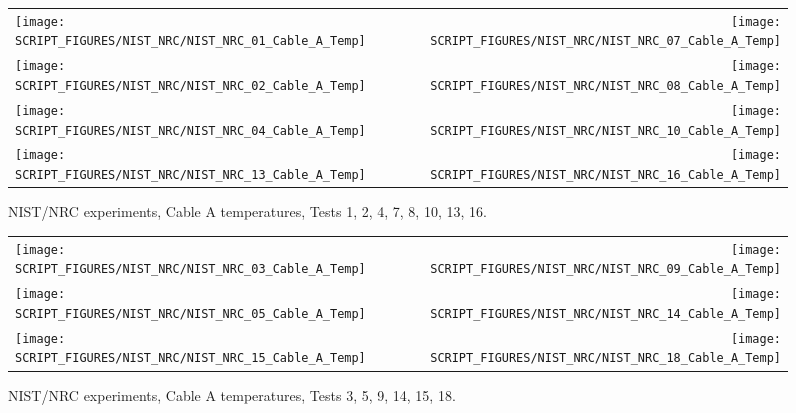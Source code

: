 \newpage

\begin{figure}[p]
\begin{tabular*}{\textwidth}{l@{\extracolsep{\fill}}r}
\texttt{[image: SCRIPT\_FIGURES/NIST\_NRC/NIST\_NRC\_01\_Cable\_A\_Temp]} &
\texttt{[image: SCRIPT\_FIGURES/NIST\_NRC/NIST\_NRC\_07\_Cable\_A\_Temp]} \\
\texttt{[image: SCRIPT\_FIGURES/NIST\_NRC/NIST\_NRC\_02\_Cable\_A\_Temp]} &
\texttt{[image: SCRIPT\_FIGURES/NIST\_NRC/NIST\_NRC\_08\_Cable\_A\_Temp]} \\
\texttt{[image: SCRIPT\_FIGURES/NIST\_NRC/NIST\_NRC\_04\_Cable\_A\_Temp]} &
\texttt{[image: SCRIPT\_FIGURES/NIST\_NRC/NIST\_NRC\_10\_Cable\_A\_Temp]} \\
\texttt{[image: SCRIPT\_FIGURES/NIST\_NRC/NIST\_NRC\_13\_Cable\_A\_Temp]} &
\texttt{[image: SCRIPT\_FIGURES/NIST\_NRC/NIST\_NRC\_16\_Cable\_A\_Temp]}
\end{tabular*}
\caption[NIST/NRC experiments, Cable A temperatures, Tests 1, 2, 4, 7, 8, 10, 13, 16]{NIST/NRC experiments, Cable A temperatures, Tests 1, 2, 4, 7, 8, 10, 13, 16.}
\label{NIST_NRC_Cable_A_Closed}
\end{figure}

\begin{figure}[p]
\begin{tabular*}{\textwidth}{l@{\extracolsep{\fill}}r}
\texttt{[image: SCRIPT\_FIGURES/NIST\_NRC/NIST\_NRC\_03\_Cable\_A\_Temp]} &
\texttt{[image: SCRIPT\_FIGURES/NIST\_NRC/NIST\_NRC\_09\_Cable\_A\_Temp]} \\
\texttt{[image: SCRIPT\_FIGURES/NIST\_NRC/NIST\_NRC\_05\_Cable\_A\_Temp]} &
\texttt{[image: SCRIPT\_FIGURES/NIST\_NRC/NIST\_NRC\_14\_Cable\_A\_Temp]} \\
\texttt{[image: SCRIPT\_FIGURES/NIST\_NRC/NIST\_NRC\_15\_Cable\_A\_Temp]} &
\texttt{[image: SCRIPT\_FIGURES/NIST\_NRC/NIST\_NRC\_18\_Cable\_A\_Temp]}
\end{tabular*}
\caption[NIST/NRC experiments, Cable A temperatures, Tests 3, 5, 9, 14, 15, 18]{NIST/NRC experiments, Cable A temperatures, Tests 3, 5, 9, 14, 15, 18.}
\label{NIST_NRC_Cable_A_Open}
\end{figure}

